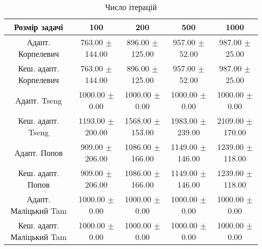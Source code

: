 \begin{table}[H]
	\centering
	\begin{tabular}{|c||c|c|c|c|}\hline
		Розмір задачі & 100 & 200 & 500 & 1000 \\ \hline \hline
		Адапт. Корпелевич & 763.00 $\pm$ 144.00 & 896.00 $\pm$ 125.00 & 957.00 $\pm$ 52.00 & 987.00 $\pm$ 25.00 \\ \hline
		Кеш. адапт. Корпелевич & 763.00 $\pm$ 144.00 & 896.00 $\pm$ 125.00 & 957.00 $\pm$ 52.00 & 987.00 $\pm$ 25.00 \\ \hline
		Адапт. Tseng & 1000.00 $\pm$ 0.00 & 1000.00 $\pm$ 0.00 & 1000.00 $\pm$ 0.00 & 1000.00 $\pm$ 0.00 \\ \hline
		Кеш. адапт. Tseng & 1193.00 $\pm$ 200.00 & 1568.00 $\pm$ 153.00 & 1983.00 $\pm$ 239.00 & 2109.00 $\pm$ 170.00 \\ \hline
		Адапт. Попов & 909.00 $\pm$ 206.00 & 1086.00 $\pm$ 166.00 & 1149.00 $\pm$ 146.00 & 1239.00 $\pm$ 118.00 \\ \hline
		Кеш. адапт. Попов & 909.00 $\pm$ 206.00 & 1086.00 $\pm$ 166.00 & 1149.00 $\pm$ 146.00 & 1239.00 $\pm$ 118.00 \\ \hline
		Адапт. Маліцький Tam & 1000.00 $\pm$ 0.00 & 1000.00 $\pm$ 0.00 & 1000.00 $\pm$ 0.00 & 1000.00 $\pm$ 0.00 \\ \hline
		Кеш. адапт. Маліцький Tam & 1000.00 $\pm$ 0.00 & 1000.00 $\pm$ 0.00 & 1000.00 $\pm$ 0.00 & 1000.00 $\pm$ 0.00 \\ \hline
	\end{tabular}
	\caption{Число ітерацій}
\end{table}

